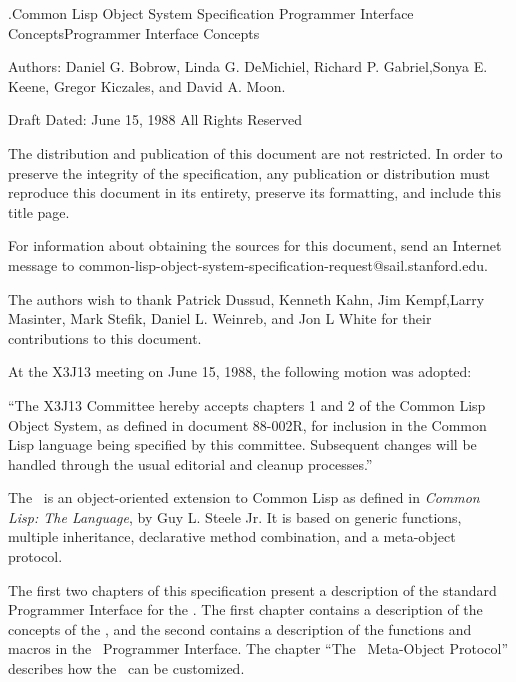 
\drafttrue
{}
\def\bookline{\CLOS\  Specification}
\def\chapline{Programmer Interface Concepts}
\def\newpage{\vfill\eject}

.{Common Lisp Object System Specification}%
{Programmer Interface Concepts}{Programmer Interface Concepts}

Authors: Daniel G. Bobrow, Linda G. DeMichiel, Richard P.
Gabriel,\hfil\break Sonya E. Keene, Gregor Kiczales, and David A.
Moon.

Draft Dated: June 15, 1988\hfil\break
All Rights Reserved

The distribution and publication of this document are not restricted.
In order to preserve the integrity of the specification, any
publication or distribution must reproduce this document in its
entirety, preserve its formatting, and include this title page.

For information about obtaining the sources for this document, send
an Internet message to 
common-lisp-object-system-specification-request@sail.stanford.edu.

The authors wish to thank Patrick Dussud, Kenneth Kahn,
Jim Kempf,\hfil\break Larry Masinter, Mark Stefik,
Daniel L. Weinreb, and Jon L White\hfil\break
for their contributions to this document.

\vskip 2pc
At the X3J13 meeting on June 15, 1988, the following motion was
adopted:

``The X3J13 Committee hereby accepts chapters 1 and 2
of the Common Lisp Object System, as defined in document
88-002R, for inclusion in the Common Lisp language being
specified by this committee. Subsequent changes will be handled
through the usual editorial and cleanup processes.''

\endTitlePage


The \CLOS\ is an object-oriented extension to Common Lisp as defined
in {\it Common Lisp: The Language}, by Guy L. Steele Jr. It is based on
generic functions, multiple inheritance, declarative method
combination, and a meta-object protocol.

The first two chapters of this specification present a description of
the standard Programmer Interface for the \CLOS.  The first chapter
contains a description of the concepts of the \CLOS, and the second
contains a description of the functions and macros in the \CLOS\
Programmer Interface.  The chapter ``The \CLOS\ Meta-Object
Protocol'' describes how the \CLOS\ can be customized.

